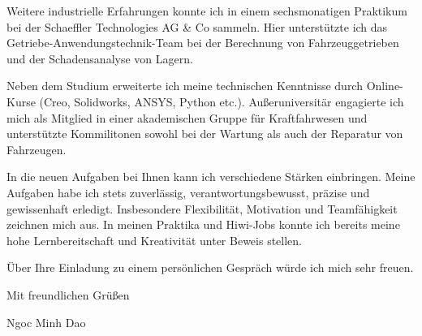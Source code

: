 \documentclass[11pt,a4paper]{letter}
\begin{document}
Weitere industrielle Erfahrungen konnte ich in einem sechsmonatigen Praktikum bei der Schaeffler Technologies AG \& Co sammeln.
Hier unterstützte ich das Getriebe-Anwendungstechnik-Team bei der Berechnung von Fahrzeuggetrieben und der Schadensanalyse von Lagern.

Neben dem Studium erweiterte ich meine technischen Kenntnisse durch Online-Kurse (Creo, Solidworks, ANSYS, Python etc.).
Außeruniversitär engagierte ich mich als Mitglied in einer akademischen Gruppe für Kraftfahrwesen und unterstützte Kommilitonen sowohl bei der Wartung als auch der Reparatur von Fahrzeugen.

In die neuen Aufgaben bei Ihnen kann ich verschiedene Stärken einbringen.
Meine Aufgaben habe ich stets zuverlässig, verantwortungsbewusst, präzise und gewissenhaft erledigt.
Insbesondere Flexibilität, Motivation und Teamfähigkeit zeichnen mich aus.
In meinen Praktika und Hiwi-Jobs konnte ich bereits meine hohe Lernbereitschaft und Kreativität unter Beweis stellen.

Über Ihre Einladung zu einem persönlichen Gespräch würde ich mich sehr freuen.

\vspace{1em}

Mit freundlichen Grüßen

Ngoc Minh Dao
\end{document}
